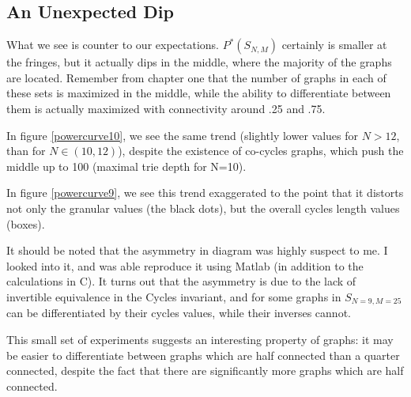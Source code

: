 \subsection{An Unexpected Dip}

What we see is counter to our expectations.
$P^*(S_{N, M})$ certainly is smaller at the fringes, but it actually dips in the middle, where the majority of the graphs are located.
Remember from chapter one that the number of graphs in each of these sets is maximized in the middle, while the ability to differentiate between them is actually maximized with connectivity around .25 and .75.

In figure \ref{powercurve10}, we see the same trend (slightly lower values for $N > 12$, than for $N \in (10, 12)$), despite the existence of co-cycles graphs, which push the middle up to 100 (maximal trie depth for N=10).

In figure \ref{powercurve9}, we see this trend exaggerated to the point that it distorts not only the granular values (the black dots), but the overall cycles length values (boxes).

It should be noted that the asymmetry in diagram \cite{powercurve9} was highly suspect to me.
I looked into it, and was able reproduce it using Matlab (in addition to the calculations in C).  
It turns out that the asymmetry is due to the lack of invertible equivalence in the Cycles invariant, and for some graphs in $S_{N=9, M=25}$ can be differentiated by their cycles values, while their inverses cannot.

This small set of experiments suggests an interesting property of graphs: it may be easier to differentiate between graphs which are half connected than a quarter connected, despite the fact that there are significantly more graphs which are half connected.
